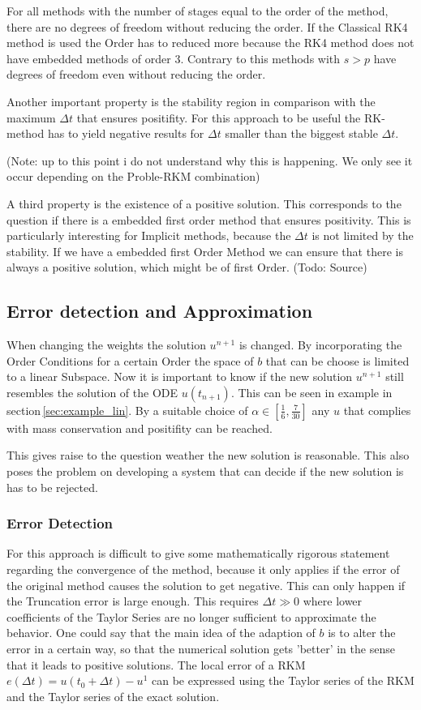\documentclass{article}
\begin{document}
For all methods with the number of stages equal to the order of the method, there are no degrees of freedom without reducing the order. 
If the Classical RK4 method is used the Order has to reduced more because the RK4 method does not have embedded methods of order 3.
Contrary to this methods with $s > p$ have degrees of freedom even without reducing the order. 

Another important property is the stability region in comparison with the maximum $\Delta t$ that ensures positifity. For this approach to be useful the RK-method has to yield negative results for $\Delta t$ smaller than the biggest stable $\Delta t$.

(Note: up to this point i do not understand why this is happening. We only see it occur depending on the Proble-RKM combination)

A third property is the existence of a positive solution. This corresponds to the question if there is a embedded first order method that ensures positivity. This is particularly interesting for Implicit methods, because the $\Delta t$ is not limited by the stability. 
If we have a embedded first Order Method we can ensure that there is always a positive solution, which might be of first Order. (Todo: Source)

\subsection{Error detection and Approximation}
When changing the weights the solution $u^{n+1}$ is changed. 
By incorporating the Order Conditions for a certain Order the space of $b$ that can be choose is limited to a linear Subspace. 
Now it is important to know if the new solution $u^{n+1}$ still resembles the solution of the ODE $u(t_{n+1})$. 
This can be seen in example in section\,\ref{sec:example_lin}.
By a suitable choice of $\alpha \in [\frac{1}{6},\frac{7}{30}]$ any $u$ that complies with mass conservation and positifity can be reached. 

This gives raise to the question weather the new solution is reasonable.
This also poses the problem on developing a system that can decide if the new solution is has to be rejected. 


 
\subsubsection{Error Detection}
For this approach is difficult to give some mathematically rigorous statement regarding the convergence of the method, because it only applies if the error of the original method causes the solution to get negative. This can only happen if the Truncation error is large enough. This requires $\Delta t \gg 0$ where lower coefficients of the Taylor Series are no longer sufficient to approximate the behavior. 
One could say that the main idea of the adaption of $b$ is to alter the error in a certain way, so that the numerical solution gets 'better' in the sense that it leads to positive solutions. 
The local error of a RKM $e(\Delta t) =u(t_0 + \Delta t) - u^1$ can be expressed using the Taylor series of the RKM and the Taylor series of the exact solution. %
\end{document}
